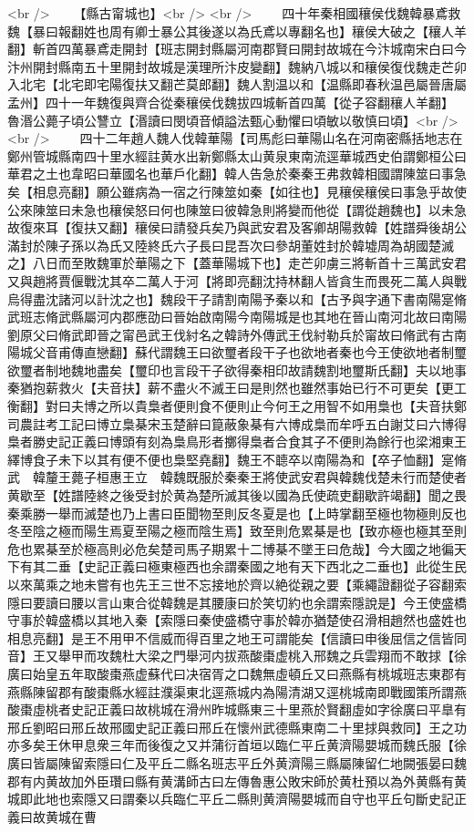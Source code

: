 <br />
　　【縣古甯城也】<br />
<br />
　　四十年秦相國穰侯伐魏韓暴鳶救魏【暴曰報翻姓也周有卿士暴公其後遂以為氏鳶以專翻名也】穰侯大破之【穰人羊翻】斬首四萬暴鳶走開封【班志開封縣屬河南郡賢曰開封故城在今汴城南宋白曰今汴州開封縣南五十里開封故城是漢理所汴皮變翻】魏納八城以和穰侯復伐魏走芒卯入北宅【北宅即宅陽復扶又翻芒莫郎翻】魏人割温以和【温縣即春秋温邑屬晉唐屬孟州】四十一年魏復與齊合從秦穰侯伐魏拔四城斬首四萬【從子容翻穰人羊翻】　魯湣公薨子頃公讐立【湣讀曰閔頃音傾謚法甄心動懼曰頃敏以敬慎曰頃】<br />
<br />
　　四十二年趙人魏人伐韓華陽【司馬彪曰華陽山名在河南密縣括地志在鄭州管城縣南四十里水經註黄水出新鄭縣太山黄泉東南流逕華城西史伯謂鄭桓公曰華君之土也韋昭曰華國名也華戶化翻】韓人告急於秦秦王弗救韓相國謂陳筮曰事急矣【相息亮翻】願公雖病為一宿之行陳筮如秦【如往也】見穰侯穰侯曰事急乎故使公來陳筮曰未急也穰侯怒曰何也陳筮曰彼韓急則將變而他從【謂從趙魏也】以未急故復來耳【復扶又翻】穰侯曰請發兵矣乃與武安君及客卿胡陽救韓【姓譜舜後胡公滿封於陳子孫以為氏又陸終氏六子長曰昆吾次曰參胡董姓封於韓墟周為胡國楚滅之】八日而至敗魏軍於華陽之下【蓋華陽城下也】走芒卯虜三將斬首十三萬武安君又與趙將賈偃戰沈其卒二萬人于河【將即亮翻沈持林翻人皆貪生而畏死二萬人與戰烏得盡沈諸河以計沈之也】魏段干子請割南陽予秦以和【古予與字通下書南陽寔脩武班志脩武縣屬河内郡應劭曰晉始啟南陽今南陽城是也其地在晉山南河北故曰南陽劉原父曰脩武即晉之甯邑武王伐紂名之韓詩外傳武王伐紂勒兵於甯故曰脩武有古南陽城父音甫傳直戀翻】蘇代謂魏王曰欲璽者段干子也欲地者秦也今王使欲地者制璽欲璽者制地魏地盡矣【璽印也言段干子欲得秦相印故請魏割地璽斯氏翻】夫以地事秦猶抱薪救火【夫音扶】薪不盡火不滅王曰是則然也雖然事始已行不可更矣【更工衡翻】對曰夫博之所以貴梟者便則食不便則止今何王之用智不如用梟也【夫音扶鄭司農註考工記曰博立梟棊宋玉楚辭曰箟蔽象棊有六博成梟而牟呼五白謝艾曰六博得梟者勝史記正義曰博頭有刻為梟鳥形者擲得梟者合食其子不便則為餘行也梁湘東王繹博食子未下以其有便不便也梟堅堯翻】魏王不聼卒以南陽為和【卒子恤翻】寔脩武　韓釐王薨子桓惠王立　韓魏既服於秦秦王將使武安君與韓魏伐楚未行而楚使者黄歇至【姓譜陸終之後受封於黄為楚所滅其後以國為氏使疏吏翻歇許竭翻】聞之畏秦乘勝一舉而滅楚也乃上書曰臣聞物至則反冬夏是也【上時掌翻至極也物極則反也冬至陰之極而陽生焉夏至陽之極而陰生焉】致至則危累棊是也【致亦極也極其至則危也累棊至於極高則必危矣楚司馬子期累十二博棊不墜王曰危哉】今大國之地徧天下有其二垂【史記正義曰極東極西也余謂秦國之地有天下西北之二垂也】此從生民以來萬乘之地未嘗有也先王三世不忘接地於齊以絶從親之要【乘繩證翻從子容翻索隱曰要讀曰腰以言山東合從韓魏是其腰康曰於笑切約也余謂索隱說是】今王使盛橋守事於韓盛橋以其地入秦【索隱曰秦使盛橋守事於韓亦猶楚使召滑相趙然也盛姓也相息亮翻】是王不用甲不信威而得百里之地王可謂能矣【信讀曰申後屈信之信皆同音】王又舉甲而攻魏杜大梁之門舉河内拔燕酸棗虚桃入邢魏之兵雲翔而不敢捄【徐廣曰始皇五年取酸棗燕虚蘇代曰决宿胥之口魏無虛頓丘又曰燕縣有桃城班志東郡有燕縣陳留郡有酸棗縣水經註濮渠東北逕燕城内為陽清湖又逕桃城南即戰國策所謂燕酸棗虛桃者史記正義曰故桃城在滑州昨城縣東三十里燕於賢翻虛如字徐廣曰平臯有邢丘劉昭曰邢丘故邢國史記正義曰邢丘在懷州武德縣東南二十里捄與救同】王之功亦多矣王休甲息衆三年而後復之又并蒲衍首垣以臨仁平丘黄濟陽嬰城而魏氏服【徐廣曰皆屬陳留索隱曰仁及平丘二縣名班志平丘外黄濟陽三縣屬陳留仁地闕張晏曰魏郡有内黄故加外臣瓚曰縣有黄溝師古曰左傳魯惠公敗宋師於黄杜預以為外黄縣有黄城即此地也索隱又曰謂秦以兵臨仁平丘二縣則黄濟陽嬰城而自守也平丘句斷史記正義曰故黄城在曹